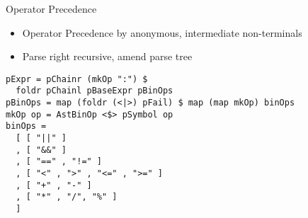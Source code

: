 \documentclass{beamer}
\begin{document}
\begin{frame}[fragile]{Operator Precedence}

\begin{itemize}
  \item Operator Precedence by anonymous, intermediate non-terminals
  \item Parse right recursive, amend parse tree
\end{itemize}

\begin{verbatim}
pExpr = pChainr (mkOp ":") $
  foldr pChainl pBaseExpr pBinOps
pBinOps = map (foldr (<|>) pFail) $ map (map mkOp) binOps
mkOp op = AstBinOp <$> pSymbol op
binOps =
  [ [ "||" ]
  , [ "&&" ]
  , [ "==" , "!=" ]
  , [ "<" , ">" , "<=" , ">=" ]
  , [ "+" , "-" ]
  , [ "*" , "/", "%" ]
  ]
\end{verbatim}

\end{frame}
\end{document}
